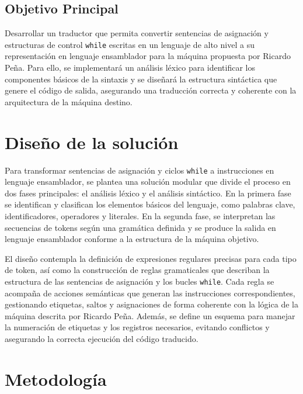 \documentclass{article}
\begin{document}
\subsection{Objetivo Principal}

Desarrollar un traductor que permita convertir sentencias de asignación y estructuras de control \texttt{while} escritas en un lenguaje de alto nivel a su representación en lenguaje ensamblador para la máquina propuesta por Ricardo Peña. Para ello, se implementará un análisis léxico para identificar los componentes básicos de la sintaxis y se diseñará la estructura sintáctica que genere el código de salida, asegurando una traducción correcta y coherente con la arquitectura de la máquina destino.



\section{Diseño de la solución}\label{sec:dis}


Para transformar sentencias de asignación y ciclos \texttt{while} a instrucciones en lenguaje ensamblador, se plantea una solución modular que divide el proceso en dos fases principales: el análisis léxico y el análisis sintáctico. En la primera fase se identifican y clasifican los elementos básicos del lenguaje, como palabras clave, identificadores, operadores y literales. En la segunda fase, se interpretan las secuencias de tokens según una gramática definida y se produce la salida en lenguaje ensamblador conforme a la estructura de la máquina objetivo.

El diseño contempla la definición de expresiones regulares precisas para cada tipo de token, así como la construcción de reglas gramaticales que describan la estructura de las sentencias de asignación y los bucles \texttt{while}. Cada regla se acompaña de acciones semánticas que generan las instrucciones correspondientes, gestionando etiquetas, saltos y asignaciones de forma coherente con la lógica de la máquina descrita por Ricardo Peña. Además, se define un esquema para manejar la numeración de etiquetas y los registros necesarios, evitando conflictos y asegurando la correcta ejecución del código traducido.

\section*{Metodología}
\end{document}
